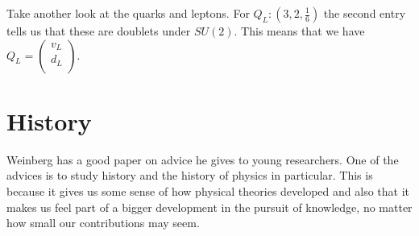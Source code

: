 
Take another look at the quarks and leptons.
For $Q_L: (3, 2, \frac{1}{6})$ the second entry tells us that these are doublets under $SU(2)$. This means that we have $Q_L = \begin{pmatrix} v_L \\ d_L \\ \end{pmatrix} $.

\section{History}%
\label{sec:history}

Weinberg has a good paper on advice he gives to young researchers. One of the advices is to study history and the history of physics in particular. This is because it gives us some sense of how physical theories developed and also that it makes us feel part of a bigger development in the pursuit of knowledge, no matter how small our contributions may seem.

